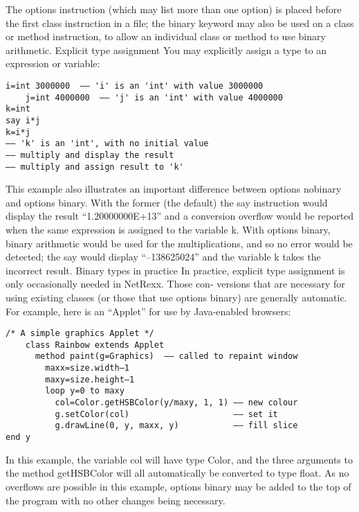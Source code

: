 The options instruction (which may list more than one option) is placed before the first class instruction in a file; the binary keyword may also be used on a class or method instruction, to allow an individual class or method to use binary arithmetic.
Explicit type assignment
You may explicitly assign a type to an expression or variable:
\begin{lstlisting}[label=assigningtype,caption=Assigning Type]
    i=int 3000000  –– 'i' is an 'int' with value 3000000
    j=int 4000000  –– 'j' is an 'int' with value 4000000
k=int
say i*j
k=i*j
–– 'k' is an 'int', with no initial value
–– multiply and display the result
–– multiply and assign result to 'k'
\end{lstlisting}
This example also illustrates an important difference between options nobinary and options binary. With the former (the default) the say instruction would display the result “1.20000000E+13” and a conversion overflow would be reported when the same expression is assigned to the variable k.
With options binary, binary arithmetic would be used for the multiplications, and so no error would be detected; the say would display “–138625024” and the variable k takes the incorrect result.
Binary types in practice
In practice, explicit type assignment is only occasionally needed in
NetRexx. Those con- versions that are necessary for using existing
classes (or those that use options binary) are generally
automatic. For example, here is an “Applet” for use by Java-enabled
browsers:
\begin{lstlisting}[label=asimpleapplet,caption=A Simple Applet]
    /* A simple graphics Applet */
    class Rainbow extends Applet
      method paint(g=Graphics)  –– called to repaint window
        maxx=size.width–1
        maxy=size.height–1
        loop y=0 to maxy
          col=Color.getHSBColor(y/maxy, 1, 1) –– new colour
          g.setColor(col)                     –– set it
          g.drawLine(0, y, maxx, y)           –– fill slice
end y
\end{lstlisting}
In this example, the variable col will have type Color, and the three
arguments to the method getHSBColor will all automatically be
converted to type float. As no overflows are possible in this example,
options binary may be added to the top of the program with no other
changes being necessary.

